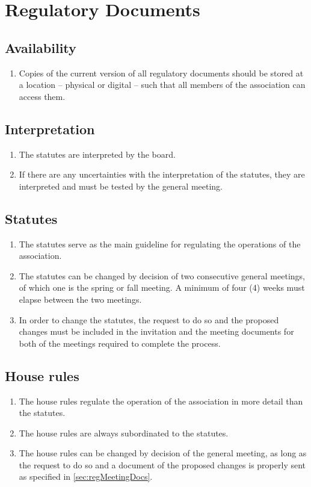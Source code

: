 \section*{Regulatory Documents}
\subsection{Availability}
\begin{enumerate}
  \item Copies of the current version of all regulatory documents should be stored at a location – physical or digital – such that all members of the association can access them.
\end{enumerate}

\subsection{Interpretation}
\begin{enumerate}
  \item The statutes are interpreted by the board.
  \item If there are any uncertainties with the interpretation of the statutes, they are interpreted and must be tested by the general meeting.
\end{enumerate}

\subsection{Statutes}
\begin{enumerate}
  \item The statutes serve as the main guideline for regulating the operations of the association.
  \item The statutes can be changed by decision of two consecutive general meetings, of which one is the spring or fall meeting. A minimum of four (4) weeks must elapse between the two meetings.
  \item In order to change the statutes, the request to do so and the proposed changes must be included in the invitation and the meeting documents for both of the meetings required to complete the process.   
\end{enumerate}

\subsection{House rules}
\begin{enumerate}
  \item The house rules regulate the operation of the association in more detail than the statutes. 
  \item The house rules are always subordinated to the statutes.
  \item The house rules can be changed by decision of the general meeting, as long as the request to do so and a document of the proposed changes is properly sent as specified in \ref{sec:regMeetingDocs}.
\end{enumerate}

